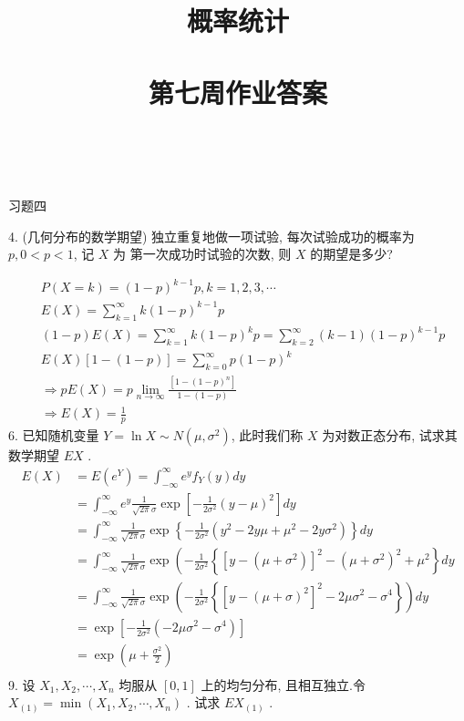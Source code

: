 \documentclass[14pt]{scrartcl} %
\title{	
	\normalfont \huge
	\textsc{概率统计} \\ [25pt] %
	\horrule{0.5pt} \\[0.4cm] %
	\huge 第七周作业答案 \\ %
	\horrule{0.5pt} \\[0.4cm] %
	\date{}
}
\numberwithin{equation}{section} %
\numberwithin{figure}{section} %
\numberwithin{table}{section} %
\begin{document}
	\maketitle %
	习题四
	
	4. (几何分布的数学期望) 独立重复地做一项试验, 每次试验成功的概率为 $p, 0<p<1$, 记 $X$ 为 第一次成功时试验的次数, 则 $X$ 的期望是多少?
	
	$$
	\begin{aligned}
		& P(X=k)=(1-p)^{k-1} p, k=1,2,3, \cdots \\
		& E(X)=\sum_{k=1}^{\infty} k(1-p)^{k-1} p \\
		& (1-p) E(X)=\sum_{k=1}^{\infty} k(1-p)^{k} p=\sum_{k=2}^{\infty}(k-1)(1-p)^{k-1} p \\
		& E(X)[1-(1-p)]=\sum_{k=0}^{\infty} p(1-p)^{k} \\
		& \Rightarrow p E(X)=p \lim _{n \rightarrow \infty} \frac{\left[1-(1-p)^{n}\right]}{1-(1-p)} \\
		& \Rightarrow E(X)=\frac{1}{p}
	\end{aligned}
	$$
	6. 已知随机变量 $Y=\ln X \sim N\left(\mu, \sigma^{2}\right)$, 此时我们称 $X$ 为对数正态分布, 试求其数学期望 $E X$ .
	$$
	\begin{aligned}
		E(X) & =E\left(e^{Y}\right)=\int_{-\infty}^{\infty} e^{y} f_{Y}(y) d y \\
		& =\int_{-\infty}^{\infty} e^{y} \frac{1}{\sqrt{2 \pi} \sigma} \exp \left[-\frac{1}{2 \sigma^{2}}(y-\mu)^{2}\right] d y \\
		& =\int_{-\infty}^{\infty} \frac{1}{\sqrt{2 \pi} \sigma} \exp \left\{-\frac{1}{2 \sigma^{2}}\left(y^{2}-2 y \mu+\mu^{2}-2 y \sigma^{2}\right)\right\} d y \\
		& =\int_{-\infty}^{\infty} \frac{1}{\sqrt{2 \pi} \sigma} \exp \left(-\frac{1}{2 \sigma^{2}}\left\{\left[y-\left(\mu+\sigma^{2}\right)\right]^{2}-\left(\mu+\sigma^{2}\right)^{2}+\mu^{2}\right\} d y\right. \\
		& =\int_{-\infty}^{\infty} \frac{1}{\sqrt{2 \pi} \sigma} \exp \left(-\frac{1}{2 \sigma^{2}}\left\{\left[y-(\mu+\sigma)^{2}\right]^{2}-2 \mu \sigma^{2}-\sigma^{4}\right\}\right) d y\\
		& =\exp \left[-\frac{1}{2 \sigma^{2}}\left(-2 \mu \sigma^{2}-\sigma^{4}\right)\right] \\
		& =\exp \left(\mu+\frac{\sigma^{2}}{2}\right) \\
	\end{aligned}
	$$
	9. 设 $X_{1}, X_{2}, \cdots, X_{n}$ 均服从 $[0,1]$ 上的均匀分布, 且相互独立.令 $X_{(1)}=\min \left(X_{1}, X_{2}, \cdots, X_{n}\right)$ . 试求 $E X_{(1)}$ .
\end{document}
